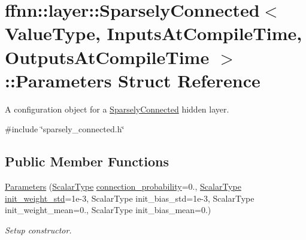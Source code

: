 \hypertarget{structffnn_1_1layer_1_1_sparsely_connected_1_1_parameters}{\section{ffnn\-:\-:layer\-:\-:Sparsely\-Connected$<$ Value\-Type, Inputs\-At\-Compile\-Time, Outputs\-At\-Compile\-Time $>$\-:\-:Parameters Struct Reference}
\label{structffnn_1_1layer_1_1_sparsely_connected_1_1_parameters}
}


A configuration object for a \hyperlink{classffnn_1_1layer_1_1_sparsely_connected}{Sparsely\-Connected} hidden layer.  




{\ttfamily \#include \char`\"{}sparsely\-\_\-connected.\-h\char`\"{}}

\subsection*{Public Member Functions}
\begin{DoxyCompactItemize}
\item 
\hyperlink{structffnn_1_1layer_1_1_sparsely_connected_1_1_parameters_acf0d0c7c3a01f292c035994e0bdda75d}{Parameters} (\hyperlink{classffnn_1_1layer_1_1internal_1_1_interface_a7f834e3365e5199bcbcd16d9abd63941}{Scalar\-Type} \hyperlink{structffnn_1_1layer_1_1_sparsely_connected_1_1_parameters_a81458846f7bd4ebdfd0b630cfecd7df0}{connection\-\_\-probability}=0., \hyperlink{classffnn_1_1layer_1_1internal_1_1_interface_a7f834e3365e5199bcbcd16d9abd63941}{Scalar\-Type} \hyperlink{structffnn_1_1layer_1_1_sparsely_connected_1_1_parameters_a50317b12cecff8ce1b6fa82874b28372}{init\-\_\-weight\-\_\-std}=1e-\/3, Scalar\-Type init\-\_\-bias\-\_\-std=1e-\/3, Scalar\-Type init\-\_\-weight\-\_\-mean=0., Scalar\-Type init\-\_\-bias\-\_\-mean=0.)
\begin{DoxyCompactList}\small\item\em Setup constructor. \end{DoxyCompactList}\end{DoxyCompactItemize}
